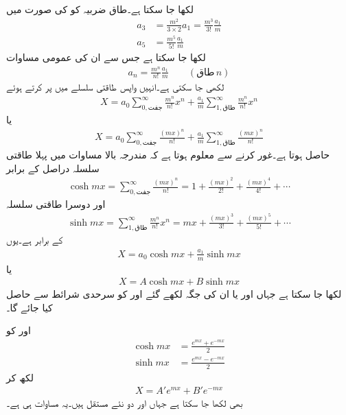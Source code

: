 لکھا جا سکتا ہے۔طاق ضربیہ کو  کی صورت میں
\begin{align*}
a_3&=\frac{m^2}{3\times 2} a_1=\frac{m^3}{3!} \frac{a_1}{m}\\
a_5&=\frac{m^5}{5!}\frac{a_1}{m}
\end{align*}
لکھا جا سکتا ہے جس سے ان کی عمومی مساوات
\begin{align*}
a_n=\frac{m^n}{n!}\frac{a_1}{m} \quad \quad (\textrm{طاق} \, n)
\end{align*}
لکھی جا سکتی ہے۔انہیں واپس طاقتی سلسلے میں پر کرتے ہوئے
\begin{align*}
X=a_0 \sum_{0,\textrm{جفت}}^{\infty} \frac{m^n}{n!}x^n+\frac{a_1}{m}\sum_{1,\textrm{طاق}}^{\infty} \frac{m^n}{n!}x^n
\end{align*}
یا
\begin{align*}
X=a_0 \sum_{0,\textrm{جفت}}^{\infty} \frac{(mx)^n}{n!}+\frac{a_1}{m}\sum_{1,\textrm{طاق}}^{\infty} \frac{(mx)^n}{n!}
\end{align*}
حاصل ہوتا ہے۔غور کرنے سے معلوم ہوتا ہے کہ مندرجہ بالا مساوات میں پہلا طاقتی سلسلہ دراصل  کے برابر
\begin{align*}
\cosh mx=\sum_{0,\textrm{جفت}}^{\infty} \frac{(mx)^n}{n!}=1+\frac{(mx)^2}{2!}+\frac{(mx)^4}{4!}+\cdots
\end{align*}
 اور دوسرا طاقتی سلسلہ 
\begin{align*}
\sinh mx=\sum_{1,\textrm{طاق}}^{\infty} \frac{m^n}{n!}x^n=mx+\frac{(mx)^3}{3!}+\frac{(mx)^5}{5!}+\cdots
\end{align*}
کے برابر ہے۔یوں
\begin{align*}
X=a_0 \cosh mx+\frac{a_1}{m} \sinh mx
\end{align*}
یا
\begin{align*}
X=A \cosh mx+B \sinh mx
\end{align*}
لکھا جا سکتا ہے جہاں  اور  یا ان کی جگہ لکھے گئے  اور   کو سرحدی شرائط سے حاصل کیا جائے گا۔

 اور  کو
\begin{align*}
\cosh mx&=\frac{e^{mx}+e^{-mx}}{2}\\
\sinh mx&=\frac{e^{mx}-e^{-mx}}{2}
\end{align*}
لکھ کر 
\begin{align*}
X=A' e^{mx}+B' e^{-mx}
\end{align*}
بھی لکھا جا سکتا ہے جہاں  اور  دو نئے مستقل ہیں۔یہ مساوات  ہی ہے۔


